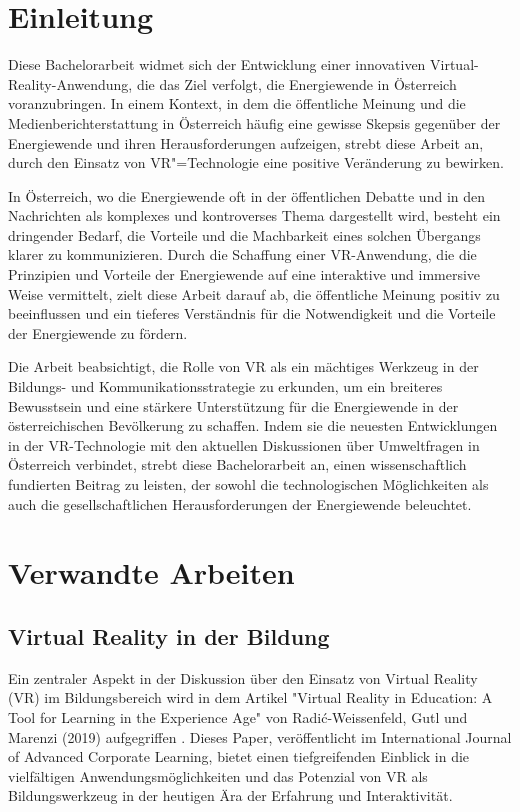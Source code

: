 \documentclass[draft]{vutinfth} %
\begin{document}
\tableofcontents %
\mainmatter

\chapter{Einleitung}
Diese Bachelorarbeit widmet sich der Entwicklung einer innovativen Virtual-Reality-Anwendung, die das Ziel verfolgt, die Energiewende in Österreich voranzubringen. In einem Kontext, in dem die öffentliche Meinung und die Medienberichterstattung in Österreich häufig eine gewisse Skepsis gegenüber der Energiewende und ihren Herausforderungen aufzeigen, strebt diese Arbeit an, durch den Einsatz von VR"=Technologie eine positive Veränderung zu bewirken.

In Österreich, wo die Energiewende oft in der öffentlichen Debatte und in den Nachrichten als komplexes und kontroverses Thema dargestellt wird, besteht ein dringender Bedarf, die Vorteile und die Machbarkeit eines solchen Übergangs klarer zu kommunizieren. Durch die Schaffung einer VR-Anwendung, die die Prinzipien und Vorteile der Energiewende auf eine interaktive und immersive Weise vermittelt, zielt diese Arbeit darauf ab, die öffentliche Meinung positiv zu beeinflussen und ein tieferes Verständnis für die Notwendigkeit und die Vorteile der Energiewende zu fördern.

Die Arbeit beabsichtigt, die Rolle von VR als ein mächtiges Werkzeug in der Bildungs- und Kommunikationsstrategie zu erkunden, um ein breiteres Bewusstsein und eine stärkere Unterstützung für die Energiewende in der österreichischen Bevölkerung zu schaffen. Indem sie die neuesten Entwicklungen in der VR-Technologie mit den aktuellen Diskussionen über Umweltfragen in Österreich verbindet, strebt diese Bachelorarbeit an, einen wissenschaftlich fundierten Beitrag zu leisten, der sowohl die technologischen Möglichkeiten als auch die gesellschaftlichen Herausforderungen der Energiewende beleuchtet.

\chapter{Verwandte Arbeiten}

\section{Virtual Reality in der Bildung}

Ein zentraler Aspekt in der Diskussion über den Einsatz von Virtual Reality (VR) im Bildungsbereich wird in dem Artikel "Virtual Reality in Education: A Tool for Learning in the Experience Age" von Radić-Weissenfeld, Gutl und Marenzi (2019) aufgegriffen \cite{hu2017virtual}. Dieses Paper, veröffentlicht im International Journal of Advanced Corporate Learning, bietet einen tiefgreifenden Einblick in die vielfältigen Anwendungsmöglichkeiten und das Potenzial von VR als Bildungswerkzeug in der heutigen Ära der Erfahrung und Interaktivität.
\end{document}
